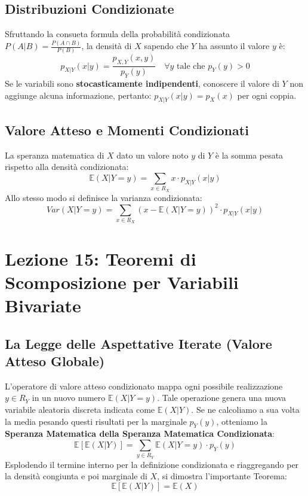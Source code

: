 \documentclass[12pt, a4paper]{article}
\begin{document}
\subsection{Distribuzioni Condizionate}
Sfruttando la consueta formula della probabilità condizionata $P(A|B) = \frac{P(A \cap B)}{P(B)}$, la densità di $X$ sapendo che $Y$ ha assunto il valore $y$ è:
$$ p_{X|Y}(x|y) = \frac{p_{X,Y}(x,y)}{p_Y(y)} \quad \forall y \text{ tale che } p_Y(y) > 0 $$
Se le variabili sono \textbf{stocasticamente indipendenti}, conoscere il valore di $Y$ non aggiunge alcuna informazione, pertanto: $p_{X|Y}(x|y) = p_X(x)$ per ogni coppia.

\subsection{Valore Atteso e Momenti Condizionati}
La speranza matematica di $X$ dato un valore noto $y$ di $Y$ è la somma pesata rispetto alla densità condizionata:
$$ \mathbb{E}(X | Y=y) = \sum_{x \in R_X} x \cdot p_{X|Y}(x|y) $$
Allo stesso modo si definisce la varianza condizionata:
$$ Var(X | Y=y) = \sum_{x \in R_X} (x - \mathbb{E}(X|Y=y))^2 \cdot p_{X|Y}(x|y) $$

\newpage


\section{Lezione 15: Teoremi di Scomposizione per Variabili Bivariate}

\subsection{La Legge delle Aspettative Iterate (Valore Atteso Globale)}
L'operatore di valore atteso condizionato mappa ogni possibile realizzazione $y \in R_Y$ in un nuovo numero $\mathbb{E}(X|Y=y)$. Tale operazione genera una nuova variabile aleatoria discreta indicata come $\mathbb{E}(X|Y)$.
Se ne calcoliamo a sua volta la media pesando questi risultati per la marginale $p_Y(y)$, otteniamo la \textbf{Speranza Matematica della Speranza Matematica Condizionata}:
$$ \mathbb{E}[\mathbb{E}(X|Y)] = \sum_{y \in R_Y} \mathbb{E}(X|Y=y) \cdot p_Y(y) $$
Esplodendo il termine interno per la definizione condizionata e riaggregando per la densità congiunta e poi marginale di $X$, si dimostra l'importante Teorema:
$$ \mathbb{E}[\mathbb{E}(X|Y)] = \mathbb{E}(X) $$
\end{document}
